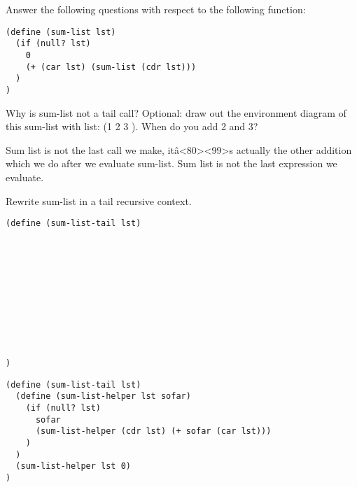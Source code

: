 \begin{blocksection}
Answer the following questions with respect to the following function:

\begin{lstlisting}
(define (sum-list lst)
  (if (null? lst)
    0
    (+ (car lst) (sum-list (cdr lst)))
  )
)
\end{lstlisting}

\vspace{2\baselineskip}

\question Why is sum-list not a tail call? Optional: draw out the environment diagram of this sum-list with list: (1 2 3
). When do you add 2 and 3?

\begin{solution}[0.5in]
Sum list is not the last call we make, itâ<80><99>s actually the other addition which we do after we evaluate sum-list.
Sum list is not the last expression we evaluate.
\end{solution}
\end{blocksection}

\newpage

\begin{blocksection}
\question Rewrite sum-list in a tail recursive context.

\begin{lstlisting}
(define (sum-list-tail lst)











)
\end{lstlisting}

\begin{solution}[0.5in]
\begin{lstlisting}
(define (sum-list-tail lst)
  (define (sum-list-helper lst sofar)
    (if (null? lst)
      sofar
      (sum-list-helper (cdr lst) (+ sofar (car lst)))
    )
  )
  (sum-list-helper lst 0)
)
\end{lstlisting}
\end{solution}

\end{blocksection}
